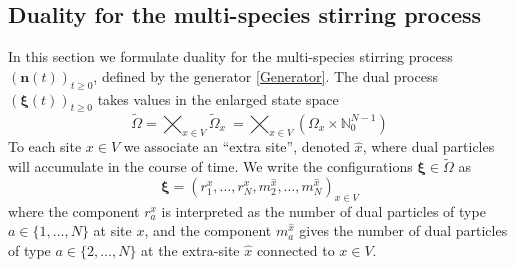 \documentclass[11pt]{article}
\numberwithin{equation}{section}
\numberwithin{equation}{subsection}
\begin{document}
\subsection{Duality for the multi-species stirring process}\label{statementDualitySubsection}
In this section we formulate duality for the multi-species stirring process $(\mathbf{n}(t))_{t\geq 0}$, defined by the generator \eqref{Generator}.
The dual  process $(\bm{\xi}(t))_{t\geq 0}$ takes values in the enlarged state space
\begin{equation}\label{dualStateSpace}
    \widetilde{\Omega}= \bigtimes_{x\in V} \widetilde{\Omega}_{x}\ = \bigtimes_{x\in V} (\Omega_{x}\times \mathbb{N}_{0}^{N-1})
\end{equation}
To each site $x\in V$ we associate an ``extra site'', denoted $\widehat{x}$,
where dual particles will accumulate in the course of time. 
We write the configurations $\bm{\xi} \in \widetilde\Omega$  as
\begin{equation}
    \bm{\xi}=\left(r_{1}^{x},\ldots,r_{N}^{x},m_{2}^{\widehat{x}},\ldots,m_{N}^{\widehat{x}}\right)_{x\in V}
\end{equation}
where the component $r_{a}^{x}$ is interpreted as the number of dual particles of type $a\in \{1,\ldots,N\}$ at site $x$, 
and the component $m_{a}^{\widehat{x}}$  gives the number of dual particles of type $a\in \{2,\ldots,N\}$ at 
the extra-site $\widehat{x}$ connected to $x\in V$.
\end{document}
